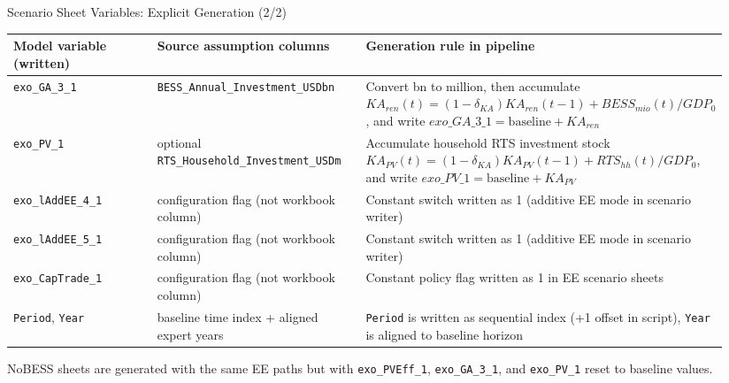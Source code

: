 \documentclass[aspectratio=169]{beamer}
\begin{document}
\begin{frame}{Scenario Sheet Variables: Explicit Generation (2/2)}
\scriptsize
\begin{tabular}{>{\raggedright\arraybackslash}p{0.23\linewidth}>{\raggedright\arraybackslash}p{0.30\linewidth}>{\raggedright\arraybackslash}p{0.41\linewidth}}
\toprule
Model variable (written) & Source assumption columns & Generation rule in pipeline \\
\midrule
\texttt{exo\_GA\_3\_1} & \texttt{BESS\_Annual\_Investment\_USDbn} &
Convert bn to million, then accumulate
$KA_{ren}(t)=(1-\delta_{KA})KA_{ren}(t-1)+BESS_{mio}(t)/GDP_0$,
and write $exo\_GA\_3\_1=\text{baseline}+KA_{ren}$ \\

\texttt{exo\_PV\_1} & optional \texttt{RTS\_Household\_Investment\_USDm} &
Accumulate household RTS investment stock
$KA_{PV}(t)=(1-\delta_{KA})KA_{PV}(t-1)+RTS_{hh}(t)/GDP_0$,
and write $exo\_PV\_1=\text{baseline}+KA_{PV}$ \\

\texttt{exo\_lAddEE\_4\_1} & configuration flag (not workbook column) &
Constant switch written as 1 (additive EE mode in scenario writer) \\

\texttt{exo\_lAddEE\_5\_1} & configuration flag (not workbook column) &
Constant switch written as 1 (additive EE mode in scenario writer) \\

\texttt{exo\_CapTrade\_1} & configuration flag (not workbook column) &
Constant policy flag written as 1 in EE scenario sheets \\

\texttt{Period}, \texttt{Year} & baseline time index + aligned expert years &
\texttt{Period} is written as sequential index (+1 offset in script), \texttt{Year} is aligned to baseline horizon \\
\bottomrule
\end{tabular}

\vspace{0.4em}
\scriptsize
NoBESS sheets are generated with the same EE paths but with \texttt{exo\_PVEff\_1}, \texttt{exo\_GA\_3\_1}, and \texttt{exo\_PV\_1} reset to baseline values.
\end{frame}
\end{document}
